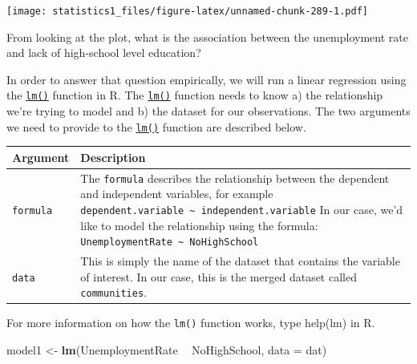 \documentclass[]{article}
\newenvironment{Shaded}{\begin{snugshade}}{\end{snugshade}}
\newcommand{\KeywordTok}[1]{\textcolor[rgb]{0.13,0.29,0.53}{\textbf{#1}}}
\newcommand{\DataTypeTok}[1]{\textcolor[rgb]{0.13,0.29,0.53}{#1}}
\newcommand{\StringTok}[1]{\textcolor[rgb]{0.31,0.60,0.02}{#1}}
\newcommand{\OperatorTok}[1]{\textcolor[rgb]{0.81,0.36,0.00}{\textbf{#1}}}
\newcommand{\NormalTok}[1]{#1}
\theoremstyle{definition}
\theoremstyle{definition}
\theoremstyle{definition}
\theoremstyle{remark}
\begin{document}
\texttt{[image: statistics1\_files/figure-latex/unnamed-chunk-289-1.pdf]}

From looking at the plot, what is the association between the
unemployment rate and lack of high-school level education?

In order to answer that question empirically, we will run a linear
regression using the \href{http://bit.ly/R_lm}{\texttt{lm()}} function
in R. The \href{http://bit.ly/R_lm}{\texttt{lm()}} function needs to
know a) the relationship we're trying to model and b) the dataset for
our observations. The two arguments we need to provide to the
\href{http://bit.ly/R_lm}{\texttt{lm()}} function are described below.

\begin{longtable}[]{@{}ll@{}}
\toprule
\begin{minipage}[b]{0.12\columnwidth}\raggedright\strut
Argument\strut
\end{minipage} & \begin{minipage}[b]{0.78\columnwidth}\raggedright\strut
Description\strut
\end{minipage}\tabularnewline
\midrule
\endhead
\begin{minipage}[t]{0.12\columnwidth}\raggedright\strut
\texttt{formula}\strut
\end{minipage} & \begin{minipage}[t]{0.78\columnwidth}\raggedright\strut
The \texttt{formula} describes the relationship between the dependent
and independent variables, for example
\texttt{dependent.variable\ \textasciitilde{}\ independent.variable} In
our case, we'd like to model the relationship using the formula:
\texttt{UnemploymentRate\ \textasciitilde{}\ NoHighSchool}\strut
\end{minipage}\tabularnewline
\begin{minipage}[t]{0.12\columnwidth}\raggedright\strut
\texttt{data}\strut
\end{minipage} & \begin{minipage}[t]{0.78\columnwidth}\raggedright\strut
This is simply the name of the dataset that contains the variable of
interest. In our case, this is the merged dataset called
\texttt{communities}.\strut
\end{minipage}\tabularnewline
\bottomrule
\end{longtable}

For more information on how the \texttt{lm()} function works, type
help(lm) in R.

\begin{Shaded}
\begin{Highlighting}[]
\NormalTok{model1 <-}\StringTok{ }\KeywordTok{lm}\NormalTok{(UnemploymentRate }\OperatorTok{~}\StringTok{ }\NormalTok{NoHighSchool, }\DataTypeTok{data =}\NormalTok{ dat)}
\end{Highlighting}
\end{Shaded}
\end{document}

